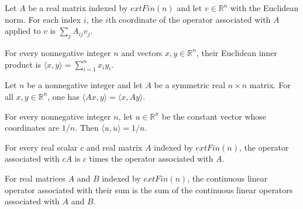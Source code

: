 \begin{theorem}
\label{Expander.toCLM_apply_coord}
\leanok
{}
Let $A$ be a real matrix indexed by $	ext{Fin}(n)$ and let $v\in\mathbb{R}^n$ with the
Euclidean norm. For each index $i$, the $i$th coordinate of the operator associated with
$A$ applied to $v$ is $\sum_j A_{ij}v_j$.
\end{theorem}

\begin{theorem}
\label{Expander.inner_eq_sum}
\leanok
{}
For every nonnegative integer $n$ and vectors $x,y\in\mathbb{R}^n$, their Euclidean
inner product is $\langle x,y\rangle=\sum_{i=1}^n x_i y_i$.
\end{theorem}

\begin{theorem}
\label{Expander.inner_toCLM_right}
\leanok
{}
Let $n$ be a nonnegative integer and let $A$ be a symmetric real $n\times n$ matrix. For
all $x,y\in\mathbb{R}^n$, one has $\langle Ax,y\rangle=\langle x,Ay\rangle$.
\end{theorem}

\begin{theorem}
\label{Expander.inner_uniform_self}
\leanok
{}
For every nonnegative integer $n$, let $u\in\mathbb{R}^n$ be the constant vector whose
coordinates are $1/n$. Then $\langle u,u\rangle=1/n$.
\end{theorem}

\begin{theorem}
\label{Expander.toCLM_smul}
\leanok
{}
For every real scalar $c$ and real matrix $A$ indexed by $	ext{Fin}(n)$, the operator
associated with $cA$ is $c$ times the operator associated with $A$.
\end{theorem}

\begin{theorem}
\label{Expander.toCLM_add}
\leanok
{}
For real matrices $A$ and $B$ indexed by $	ext{Fin}(n)$, the continuous linear operator
associated with their sum is the sum of the continuous linear operators associated with
$A$ and $B$.
\end{theorem}

